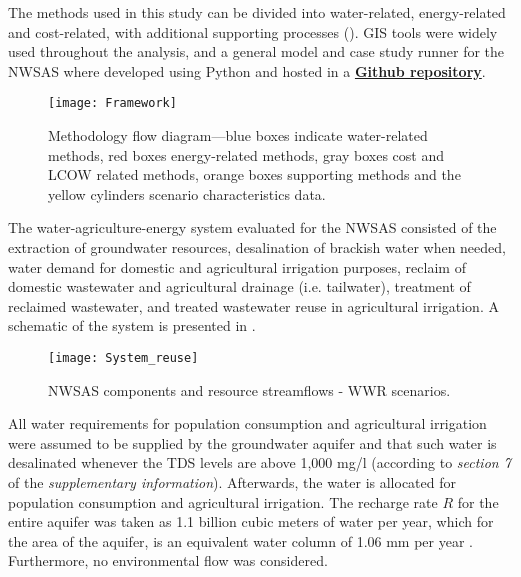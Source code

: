 The methods used in this study can be divided into water-related, energy-related and cost-related, with additional supporting processes (). GIS tools were widely used throughout the analysis, and a general model and case study runner for the NWSAS where developed using Python and hosted in a \href{https://github.com/camiloramirezgo/NWSAS-paper-model}{\textbf{Github repository}}.

\begin{figure*}[!h]
	\centering
	\texttt{[image: Framework]}
	\caption{Methodology flow diagram---blue boxes indicate water-related methods, red boxes energy-related methods, gray boxes cost and LCOW related methods, orange boxes supporting methods and the yellow cylinders scenario characteristics data.}
	\label{fig:framework}
\end{figure*}

The water-agriculture-energy system evaluated for the NWSAS consisted of the extraction of groundwater resources, desalination of brackish water when needed, water demand for domestic and agricultural irrigation purposes, reclaim of domestic wastewater and agricultural drainage (i.e. tailwater), treatment of reclaimed wastewater, and treated wastewater reuse in agricultural irrigation. A schematic of the system is presented in .

\begin{figure*}[!ht]
	\centering
	\texttt{[image: System\_reuse]}
	\caption{NWSAS components and resource streamflows - WWR scenarios.}
	\label{fig:system_reuse}
\end{figure*}

All water requirements for population consumption and agricultural irrigation were assumed to be supplied by the groundwater aquifer and that such water is desalinated whenever the TDS levels are above 1,000 mg/l \cite{fao1985water} (according to \textit{section 7} of the \textit{supplementary information}). Afterwards, the water is allocated for population consumption and agricultural irrigation. 
The recharge rate $R$ for the entire aquifer was taken as 1.1 billion cubic meters of water per year, which for the area of the aquifer, is an equivalent water column of 1.06 mm per year \cite{BetterValorizationIrrigation2015}. Furthermore, no environmental flow was considered.

